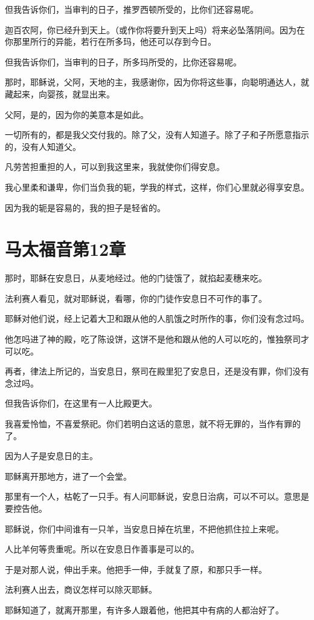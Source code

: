 \documentclass[12pt,oneside]{book}
\begin{document}
但我告诉你们，当审判的日子，推罗西顿所受的，比你们还容易呢。

迦百农阿，你已经升到天上。（或作你将要升到天上吗）将来必坠落阴间。因为在你那里所行的异能，若行在所多玛，他还可以存到今日。

但我告诉你们，当审判的日子，所多玛所受的，比你还容易呢。

那时，耶稣说，父阿，天地的主，我感谢你，因为你将这些事，向聪明通达人，就藏起来，向婴孩，就显出来。

父阿，是的，因为你的美意本是如此。

一切所有的，都是我父交付我的。除了父，没有人知道子。除了子和子所愿意指示的，没有人知道父。

凡劳苦担重担的人，可以到我这里来，我就使你们得安息。

我心里柔和谦卑，你们当负我的轭，学我的样式，这样，你们心里就必得享安息。

因为我的轭是容易的，我的担子是轻省的。

\chapter{马太福音第12章}
那时，耶稣在安息日，从麦地经过。他的门徒饿了，就掐起麦穗来吃。

法利赛人看见，就对耶稣说，看哪，你的门徒作安息日不可作的事了。

耶稣对他们说，经上记着大卫和跟从他的人肌饿之时所作的事，你们没有念过吗。

他怎吗进了神的殿，吃了陈设饼，这饼不是他和跟从他的人可以吃的，惟独祭司才可以吃。

再者，律法上所记的，当安息日，祭司在殿里犯了安息日，还是没有罪，你们没有念过吗。

但我告诉你们，在这里有一人比殿更大。

我喜爱怜恤，不喜爱祭祀。你们若明白这话的意思，就不将无罪的，当作有罪的了。

因为人子是安息日的主。

耶稣离开那地方，进了一个会堂。

那里有一个人，枯乾了一只手。有人问耶稣说，安息日治病，可以不可以。意思是要控告他。

耶稣说，你们中间谁有一只羊，当安息日掉在坑里，不把他抓住拉上来呢。

人比羊何等贵重呢。所以在安息日作善事是可以的。

于是对那人说，伸出手来。他把手一伸，手就复了原，和那只手一样。

法利赛人出去，商议怎样可以除灭耶稣。

耶稣知道了，就离开那里，有许多人跟着他，他把其中有病的人都治好了。
\end{document}
